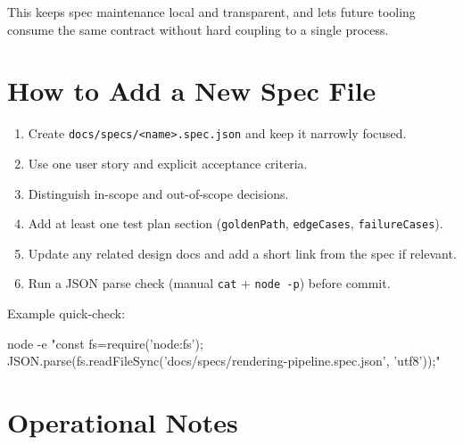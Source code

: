 This keeps spec maintenance local and transparent, and lets future tooling consume the same contract without hard coupling to a single process.

\section{How to Add a New Spec File}\label{record-012-how-to-add-a-new-spec-file}

\begin{enumerate}
\def\labelenumi{\arabic{enumi}.}
\tightlist
\item
  Create \texttt{d\allowbreak{}o\allowbreak{}c\allowbreak{}s\allowbreak{}/\allowbreak{}s\allowbreak{}p\allowbreak{}e\allowbreak{}c\allowbreak{}s\allowbreak{}/\allowbreak{}<\allowbreak{}n\allowbreak{}a\allowbreak{}m\allowbreak{}e\allowbreak{}>\allowbreak{}.\allowbreak{}s\allowbreak{}p\allowbreak{}e\allowbreak{}c\allowbreak{}.\allowbreak{}j\allowbreak{}s\allowbreak{}o\allowbreak{}n} and keep it narrowly focused.
\item
  Use one user story and explicit acceptance criteria.
\item
  Distinguish in-scope and out-of-scope decisions.
\item
  Add at least one test plan section (\texttt{g\allowbreak{}o\allowbreak{}l\allowbreak{}d\allowbreak{}e\allowbreak{}n\allowbreak{}P\allowbreak{}a\allowbreak{}t\allowbreak{}h}, \texttt{e\allowbreak{}d\allowbreak{}g\allowbreak{}e\allowbreak{}C\allowbreak{}a\allowbreak{}s\allowbreak{}e\allowbreak{}s}, \texttt{f\allowbreak{}a\allowbreak{}i\allowbreak{}l\allowbreak{}u\allowbreak{}r\allowbreak{}e\allowbreak{}C\allowbreak{}a\allowbreak{}s\allowbreak{}e\allowbreak{}s}).
\item
  Update any related design docs and add a short link from the spec if relevant.
\item
  Run a JSON parse check (manual \texttt{c\allowbreak{}a\allowbreak{}t} + \texttt{n\allowbreak{}o\allowbreak{}d\allowbreak{}e\allowbreak{} \allowbreak{}-\allowbreak{}p}) before commit.
\end{enumerate}

Example quick-check:

\begin{CodeBlock}
node -e "const fs=require('node:fs'); JSON.parse(fs.readFileSync('docs/specs/rendering-pipeline.spec.json', 'utf8'));"
\end{CodeBlock}

\section{Operational Notes}\label{record-012-operational-notes}

